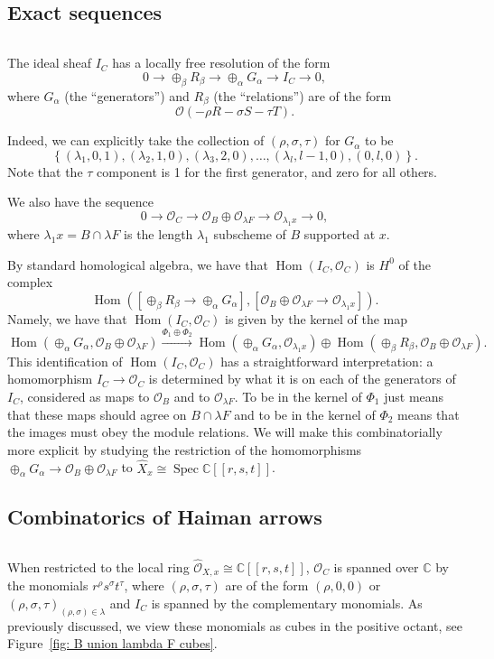 \documentclass[12pt]{amsart}
\theoremstyle{definition}
\newcommand{\CC} {\mathbb{C}}          %
\renewcommand{\O}{\mathcal{O}}
\newcommand{\Hom}{\operatorname{Hom}}
\newcommand{\Spec}{\operatorname{Spec}}
\newcommand{\SubSecSpace}{$\,$\vspace{0.2cm}\par } %
\begin{document}
\subsection{Exact sequences}\SubSecSpace 

The ideal sheaf $I_{C}$ has a locally free resolution of the form
\begin{equation}\label{eqn: R-->G-->I_C exact sequence}
0\to \oplus_{\beta}R_{\beta} \to \oplus_{\alpha }G_{\alpha } \to I_{C}
\to 0,
\end{equation}
where $G_{\alpha}$ (the ``generators'') and $R_{\beta}$ (the
``relations'') are of the form 
\[
\O (-\rho R-\sigma S-\tau T).
\]

Indeed, we can explicitly take the collection of $(\rho ,\sigma
,\tau)$ for $G_{\alpha}$ to be 
\[
\left\{(\lambda_{1},0,1),(\lambda_{2},1,0),(\lambda_{3},2,0),\dotsc
,(\lambda_{l},l-1,0),(0,l,0) \right\}.
\]
Note that the $\tau$ component is 1 for the first generator, and zero
for all others.

We also have the sequence
\[
0\to \O_{C} \to \O_{B}\oplus\O_{\lambda F}\to \O_{\lambda_{1}x}\to 0,
\]
where $\lambda_{1}x=B\cap \lambda F$ is the length $\lambda_{1}$
subscheme of $B$ supported at $x$.

By standard homological algebra, we have that $\Hom (I_{C},\O_{C})$ is
$H^{0}$ of the complex
\[
\Hom \left(\left[\oplus_{\beta}R_{\beta}\to
\oplus_{\alpha}G_{\alpha} \right],[\O_{B}\oplus \O_{\lambda F}\to
\O_{\lambda_{1}x}] \right).
\]
Namely, we have that $\Hom (I_{C},\O_{C})$ is given by the kernel of
the map
\[
\Hom (\oplus_{\alpha}G_{\alpha},\O_{B}\oplus \O_{\lambda
F}) \xrightarrow{\Phi_{1}\oplus \Phi_{2}}
\Hom(\oplus_{\alpha}G_{\alpha},\O_{\lambda_{1}x})\oplus \Hom
(\oplus_{\beta}R_{\beta},\O_{B}\oplus \O_{\lambda F}).
\]
This identification of $\Hom (I_{C},\O_{C})$ has a straightforward
interpretation: a homomorphism $I_{C}\to \O_C$ is determined by what
it is on each of the generators of $I_{C}$, considered as maps to
$\O_{B}$ and to $\O_{\lambda F}$. To be in the kernel of $\Phi_{1}$
just means that these maps should agree on $B\cap \lambda F$ and to be
in the kernel of $\Phi_{2}$ means that the images must obey the module
relations. We will make this combinatorially more explicit by studying
the restriction of the homomorphisms $\oplus_{\alpha}G_{\alpha}\to
\O_{B}\oplus \O_{\lambda F}$ to $\widehat{X}_{x}\cong \Spec \CC
[[r,s,t]]$.

\subsection{Combinatorics of Haiman arrows}\label{subsec: combinatorics of Haiman arrows}
\SubSecSpace 
When restricted to the local ring $\widehat{\O}_{X,x} \cong \CC [[r,s,t]]$,
$\O_{C}$ is spanned over $\CC$ by the monomials
$r^{\rho}s^{\sigma}t^{\tau}$, where $(\rho ,\sigma ,\tau )$ are of the
form $(\rho ,0,0)$ or $(\rho ,\sigma ,\tau )_{(\rho ,\sigma )\in
\lambda}$ and $I_{C}$ is spanned by the complementary monomials. As
previously discussed, we view these monomials as cubes in the positive
octant, see Figure~\ref{fig: B union lambda F cubes}.
\end{document}
